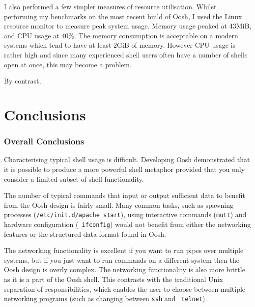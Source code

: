 \documentclass[12pt,twoside,notitlepage]{report}
\begin{document}
I also performed a few simpler measures of resource
utilisation. Whilst performing my benchmarks on the most recent build
of Oosh, I used the Linux resource monitor to measure peak system
usage. Memory usage peaked at 43MiB, and CPU usage at 40\%. The memory
consumption is acceptable on a modern systems which tend to have at
least 2GiB of memory. However CPU usage is rather high and since many
experienced shell users often have a number of shells open at once,
this may become a problem.

By contrast, %


\cleardoublepage
\chapter{Conclusions}


\subsection{Overall Conclusions}
Characterising typical shell usage is difficult. Developing Oosh
demonstrated that it is possible to produce a more powerful shell
metaphor provided that you only consider a limited subset of shell
functionality. 

The number of typical commands that input or output sufficient data to
benefit from the Oosh design is fairly small. Many common tasks, such
as spawning processes ({\tt /etc/init.d/apache start}), using
interactive commands ({\tt mutt}) and hardware configuration ({\tt
  ifconfig}) would not benefit from either the networking features or
the structured data format found in Oosh.

The networking functionality is excellent if you want to run pipes
over multiple systems, but if you just want to run commands on a
different system then the Oosh design is overly complex. The
networking functionality is also more brittle as it is a part of the
Oosh shell. This contrasts with the traditional Unix separation of
responsibilities, which enables the user to choose between multiple
networking programs (such as changing between {\tt ssh} and {\tt
  telnet}).
\end{document}
